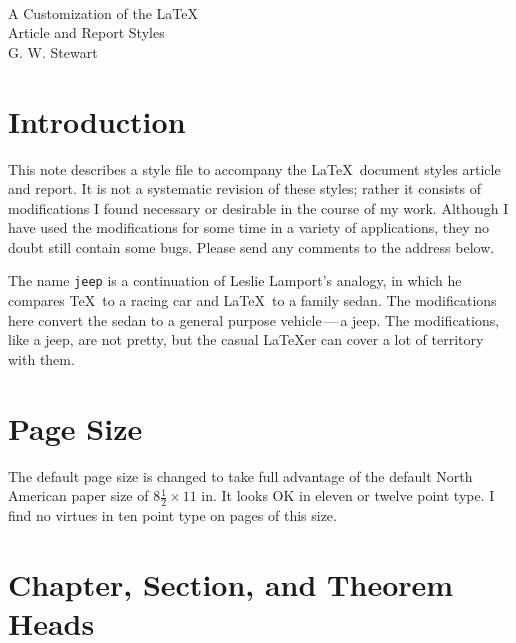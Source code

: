 \cfoot{\thepage}
\underhead
\tighttoc
\thispagestyle{plain}
\numberbysection

\begin{center}
\large{}\smallskip\\
A Customization of the \LaTeX\\
Article and Report Styles
\smallskip\\
G.  W.  Stewart
\bigskip
\end{center}

\tableofcontents

\section{Introduction}

This note describes a style file to accompany the \LaTeX\ document
styles article and report.  It is not a systematic revision of these
styles; rather it consists of modifications I found necessary or
desirable in the course of my work.  Although I have used the
modifications for some time in a variety of applications, they no
doubt still contain some bugs.  Please send any comments to the
address below.

The name \verb|jeep| is a continuation of Leslie Lamport's analogy,
in which he compares \TeX\ to a racing car and \LaTeX\ to a family
sedan.  The modifications here convert the sedan to a general purpose
vehicle\,---\,a jeep.  The modifications, like a jeep, are not
pretty, but the casual \LaTeX er can cover a lot of territory with
them.

\section{Page Size}

The default page size is changed to take full advantage of the
default North American paper size of $8\frac{1}{2}\times 11$ in.  It
looks OK in eleven or twelve point type.  I find no virtues in ten
point type on pages of this size.

\section{Chapter, Section, and Theorem Heads}

